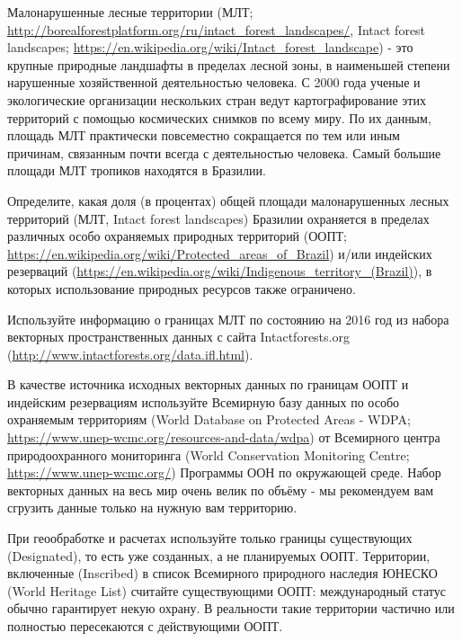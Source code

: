 
Малонарушенные лесные территории (МЛТ; \url{http://borealforestplatform.org/ru/intact_forest_landscapes/}, 
Intact forest landscapes; \url{https://en.wikipedia.org/wiki/Intact_forest_landscape}) - это крупные природные ландшафты в пределах лесной зоны, в наименьшей степени нарушенные хозяйственной деятельностью человека. С 2000 года ученые и экологические организации нескольких стран ведут картографирование этих территорий с помощью космических снимков по всему миру. По их данным, площадь МЛТ практически повсеместно сокращается по тем или иным причинам, связанным почти всегда с деятельностью человека. Самый большие площади МЛТ тропиков находятся в Бразилии. 

Определите, какая доля (в процентах) общей площади малонарушенных лесных территорий 
(МЛТ, Intact forest landscapes) Бразилии охраняется в пределах различных особо охраняемых природных территорий 
(ООПТ; \url{https://en.wikipedia.org/wiki/Protected_areas_of_Brazil}) и/или индейских резерваций (\url{https://en.wikipedia.org/wiki/Indigenous_territory_(Brazil)}), в которых использование \linebreak природных ресурсов также ограничено.

Используйте информацию о границах МЛТ по состоянию на 2016 год из набора векторных пространственных данных с 
сайта Intactforests.org\\ (\url{http://www.intactforests.org/data.ifl.html}).

В качестве источника исходных векторных данных по границам ООПТ и индейским резервациям используйте 
Всемирную базу данных по особо охраняемым территориям (World Database on Protected Areas - WDPA; \url{https://www.unep-wcmc.org/resources-and-data/wdpa}) 
от Всемирного центра природоохранного мониторинга (World Conservation Monitoring Centre; \url{https://www.unep-wcmc.org/}) Программы ООН по окружающей среде. Набор векторных данных на весь мир очень велик по объёму - мы рекомендуем вам сгрузить данные только на нужную вам территорию.

При геообработке и расчетах используйте только границы существующих \linebreak (Designated), то есть уже созданных, а не планируемых ООПТ. Территории, включенные (Inscribed) в список Всемирного природного наследия ЮНЕСКО (World Heritage List) считайте существующими ООПТ: международный статус обычно гарантирует некую охрану. В реальности такие территории частично или полностью пересекаются с действующими ООПТ.

